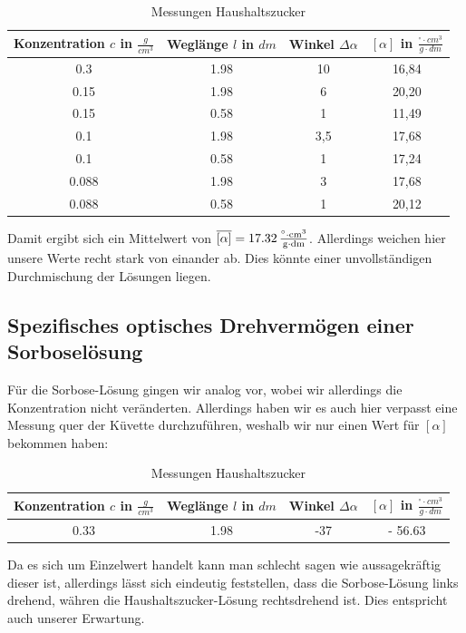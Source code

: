 \documentclass[a4paper,titlepage]{scrartcl}
\numberwithin{equation}{section}
\begin{document}
\begin{table}[H]
\centering
\begin{tabular}{c|c|c|c}
	Konzentration $c$ in $\frac{g}{{cm}^3}$ & Weglänge $l$ in $dm$ & Winkel $\Delta \alpha$ & $[\alpha]$ in $\frac{^\circ \cdot {cm}^3}{g \cdot dm}$ \\
	\hline
	0.3 & 1.98 & 10 & 16,84\\
	0.15 & 1.98 & 6 & 20,20\\
	0.15 & 0.58 & 1 & 11,49\\
	0.1 & 1.98 & 3,5 & 17,68\\
	0.1 & 0.58 & 1 & 17,24\\
	0.088 & 1.98 & 3 & 17,68\\
	0.088 & 0.58 & 1 & 20,12\\
\end{tabular}
\caption{Messungen Haushaltszucker}
\label{tab:aufgabe41}
\end{table}


Damit ergibt sich ein Mittelwert von $\overline{[\alpha]} = \unit[17.32]{\frac{^\circ \cdot {cm}^3}{g \cdot dm}}$. Allerdings weichen hier unsere Werte recht stark von einander ab. Dies könnte einer unvollständigen Durchmischung der Lösungen liegen.
\subsection{Spezifisches optisches Drehvermögen einer Sorboselösung}
Für die Sorbose-Lösung gingen wir analog vor, wobei wir allerdings die Konzentration nicht veränderten. Allerdings haben wir es auch hier verpasst eine Messung quer der Küvette durchzuführen, weshalb wir nur einen Wert für $[\alpha]$ bekommen haben:

\begin{table}[H]
\centering
\begin{tabular}{c|c|c|c}
	Konzentration $c$ in $\frac{g}{{cm}^3}$ & Weglänge $l$ in $dm$ & Winkel $\Delta \alpha$ & $[\alpha]$ in $\frac{^\circ \cdot {cm}^3}{g \cdot dm}$ \\
	\hline
	0.33 & 1.98 & -37 & - 56.63\\
\end{tabular}
\caption{Messungen Haushaltszucker}
\label{tab:aufgabe41}
\end{table}

Da es sich um Einzelwert handelt kann man schlecht sagen wie aussagekräftig dieser ist, allerdings lässt sich eindeutig feststellen, dass die Sorbose-Lösung links drehend, währen die Haushaltszucker-Lösung rechtsdrehend ist. Dies entspricht auch unserer Erwartung.
\end{document}
